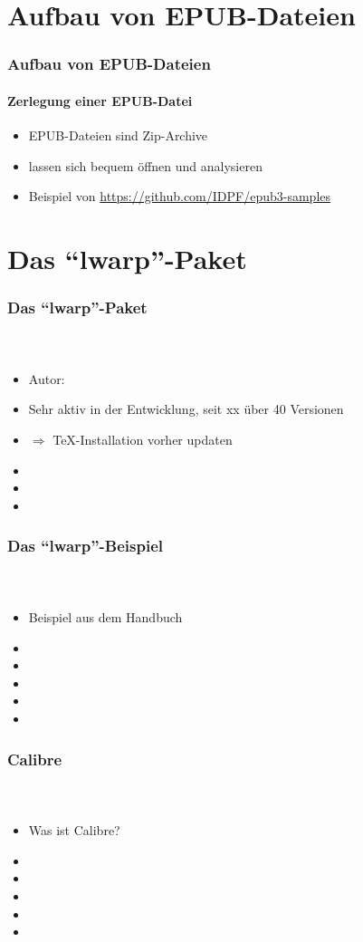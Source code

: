 \documentclass[12pt,ngerman]{beamer}
\begin{document}
\section{Aufbau von EPUB-Dateien}

\begin{frame}
\frametitle{Aufbau von EPUB-Dateien}
\framesubtitle{Zerlegung einer EPUB-Datei}

\begin{itemize}
\item EPUB-Dateien sind Zip-Archive
\item lassen sich bequem öffnen und analysieren
\item Beispiel von \url{https://github.com/IDPF/epub3-samples}
\end{itemize}


\end{frame}

\section{Das \enquote{lwarp}-Paket}

\begin{frame}
\frametitle{Das \enquote{lwarp}-Paket}
\framesubtitle{~}

\begin{itemize}
\item Autor: 
\item Sehr aktiv in der Entwicklung, seit xx über 40 Versionen
\item $\Rightarrow$ \TeX-Installation vorher updaten
\item 
\item 
\item 
\end{itemize}
\end{frame}

\begin{frame}
\frametitle{Das \enquote{lwarp}-Beispiel}
\framesubtitle{~}

\begin{itemize}
\item Beispiel aus dem Handbuch
\item 
\item 
\item 
\item 
\item 
\end{itemize}
\end{frame}


\begin{frame}
\frametitle{Calibre}
\framesubtitle{~}

\begin{itemize}
\item Was ist Calibre?
\item 
\item 
\item 
\item 
\item 
\end{itemize}
\end{frame}
\end{document}
